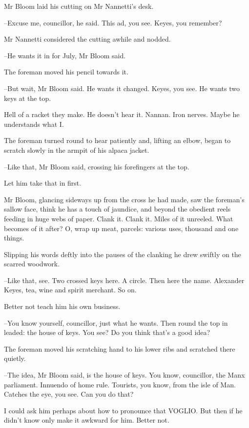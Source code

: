 Mr Bloom laid his cutting on Mr Nannetti's desk.

--Excuse me, councillor, he said. This ad, you see. Keyes, you remember?

Mr Nannetti considered the cutting awhile and nodded.

--He wants it in for July, Mr Bloom said.

The foreman moved his pencil towards it.

--But wait, Mr Bloom said. He wants it changed. Keyes, you see. He wants
two keys at the top.

Hell of a racket they make. He doesn't hear it. Nannan. Iron nerves.
Maybe he understands what I.

The foreman turned round to hear patiently and, lifting an elbow,
began to scratch slowly in the armpit of his alpaca jacket.

--Like that, Mr Bloom said, crossing his forefingers at the top.

Let him take that in first.

Mr Bloom, glancing sideways up from the cross he had made, saw the
foreman's sallow face, think he has a touch of jaundice, and beyond the
obedient reels feeding in huge webs of paper. Clank it. Clank it. Miles of
it unreeled. What becomes of it after? O, wrap up meat, parcels: various
uses, thousand and one things.

Slipping his words deftly into the pauses of the clanking he drew
swiftly on the scarred woodwork.



--Like that, see. Two crossed keys here. A circle. Then here the name.
Alexander Keyes, tea, wine and spirit merchant. So on.

Better not teach him his own business.

--You know yourself, councillor, just what he wants. Then round the top
in leaded: the house of keys. You see? Do you think that's a good idea?

The foreman moved his scratching hand to his lower ribs and scratched
there quietly.

--The idea, Mr Bloom said, is the house of keys. You know, councillor,
the Manx parliament. Innuendo of home rule. Tourists, you know, from the
isle of Man. Catches the eye, you see. Can you do that?

I could ask him perhaps about how to pronounce that VOGLIO. But
then if he didn't know only make it awkward for him. Better not.

